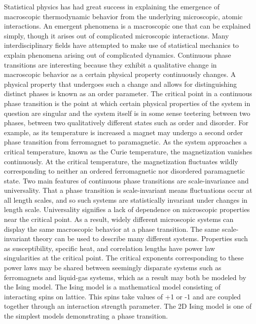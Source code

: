 \documentclass[12pt]{article}
\begin{document}
Statistical physics has had great success in explaining the emergence of macroscopic thermodynamic behavior from the underlying microscopic, atomic interactions. An emergent phenomena is a macroscopic one that can be explained simply, though it arises out of complicated microscopic interactions. Many interdisciplinary fields have attempted to make use of statistical mechanics to explain phenomena arising out of complicated dynamics. Continuous phase transitions are interesting because they exhibit a qualitative change in macroscopic behavior as a certain physical property continuously changes. A physical property that undergoes such a change and allows for distinguishing distinct phases is known as an order parameter. The critical point in a continuous phase transition is the point at which certain physical properties of the system in question are singular and the system itself is in some sense teetering between two phases, between two qualitatively different states such as order and disorder. For example, as its temperature is increased a magnet may undergo a second order phase transition from ferromagnet to paramagnetic. As the system approaches a critical temperature, known as the Curie temperature, the magnetization vanishes continuously. At the critical temperature, the magnetization fluctuates wildly corresponding to neither an ordered ferromagnetic nor disordered paramagnetic state. Two main features of continuous phase transitions are scale-invariance and universality. That a phase transition is scale-invariant means fluctuations occur at all length scales, and so such systems are statistically invariant under changes in length scale. Universality signifies a lack of dependence on microscopic properties near the critical point. As a result, widely different microscopic systems can display the same macroscopic behavior at a phase transition. The same scale-invariant theory can be used to describe many different systems. Properties such as susceptibility, specific heat, and correlation lengths have power law singularities at the critical point. The critical exponents corresponding to these power laws  may be shared between seemingly disparate systems such as ferromagnets and liquid-gas systems, which as a result may both be modeled by the Ising model. The Ising model is a mathematical model consisting of interacting spins on lattice. This spins take values of +1 or -1 and are coupled together through an interaction strength parameter. The 2D Ising model is one of the simplest models demonstrating a phase transition. \cite{Sethna2011a}
\end{document}
